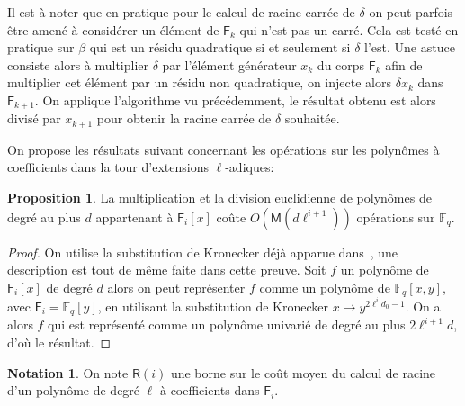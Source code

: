 \documentclass[10pt,a4paper]{book}
\theoremstyle{plain}
\theoremstyle{definition}
\theoremstyle{definition}
\theoremstyle{definition}
\newtheorem{prop}[thm]{Proposition}
\theoremstyle{definition}
\theoremstyle{remark}
\theoremstyle{remark}
\theoremstyle{definition}
\newtheorem{nota}[thm]{Notation}
\begin{document}
Il est à noter que en pratique pour le calcul de racine carrée de $\delta$ on peut parfois être amené à considérer un élément de $\mathsf{F}_k$ qui n'est pas un carré. Cela est testé en pratique sur $\beta$ qui est un résidu quadratique si et seulement si $\delta$ l'est. Une astuce consiste alors à multiplier $\delta$ par l'élément générateur $x_{k}$ du corps $\mathsf{F}_k$ afin  de multiplier cet élément par un résidu non quadratique, on injecte alors $\delta x_k$ dans $\mathsf{F}_{k+1}$. On applique l'algorithme vu précédemment, le résultat obtenu est alors divisé par $x_{k+1}$ pour obtenir la racine carrée de $\delta$ souhaitée.

On propose les résultats suivant concernant les opérations sur les 
polynômes à coefficients dans la tour d'extensions $\ell$-adiques:

\begin{prop}
\label{pro:mult:pol}
La multiplication et la division euclidienne de polynômes de degré au plus $d$ 
appartenant à $\mathsf{F}_i[x]$ coûte $O(\mathsf{M}(d\ell^{i+1}))$ opérations sur 
$\mathbb{F}_q$.
\end{prop}

\begin{proof}
On utilise la substitution de Kronecker déjà apparue 
dans~\cite[Lemma 2.2]{vzGShoup92}, une description est tout de même faite dans 
cette preuve. Soit $f$ un polynôme de $\mathsf{F}_{i}[x]$ de degré $d$ alors on 
peut représenter $f$ comme un polynôme de $\mathbb{F}_q[x,y]$, avec 
$\mathsf{F}_i=\mathbb{F}_q[y]$, en utilisant la substitution de 
Kronecker $x \rightarrow y^{2\ell^{i}d_0-1}$. On a alors $f$ qui est représenté
 comme un polynôme univarié de degré au plus $2\ell^{i+1} d$, d'où le résultat.
\end{proof}

\begin{nota}
\label{not:cout:R}
On note $\mathsf{R}(i)$ une borne sur le coût moyen du calcul de racine d'un polynôme de degré $\ell$ à coefficients dans $\mathsf{F}_i$.
\end{nota}
\end{document}
